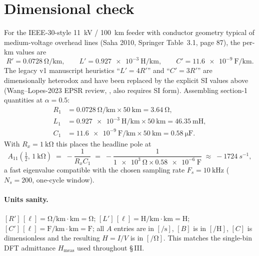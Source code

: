 \documentclass[11pt,a4paper]{article}
\begin{document}
\section{Dimensional check}\label{sec:dim}

For the IEEE-30-style 11~kV / 100~km feeder with conductor geometry
typical of medium-voltage overhead lines (Saha 2010, Springer
Table~3.1, page 87), the per-km values are
\begin{equation}
  R' = \SI{0.0728}{\ohm\per\km},\qquad
  L' = \SI{0.927e-3}{\henry\per\km},\qquad
  C' = \SI{11.6e-9}{\farad\per\km}.
\end{equation}
The legacy v1 manuscript heuristics ``$L' = 4R'$'' and ``$C' = 3R'$''
are dimensionally heterodox and have been replaced by the explicit SI
values above (Wang--Lopes-2023 EPSR review,
, also requires SI form).
Assembling section-1 quantities at $\alpha = 0.5$:
\begin{align}
R_1 &= \SI{0.0728}{\ohm\per\km}\times \SI{50}{\km}
     = \SI{3.64}{\ohm}, \\
L_1 &= \SI{0.927e-3}{\henry\per\km}\times \SI{50}{\km}
     = \SI{46.35}{\milli\henry}, \\
C_1 &= \SI{11.6e-9}{\farad\per\km}\times \SI{50}{\km}
     = \SI{0.58}{\micro\farad}.
\end{align}
With $R_x = \SI{1}{\kilo\ohm}$ this places the headline pole at
\begin{equation}
  A_{11}(\tfrac12,\,\SI{1}{\kilo\ohm}) \;=\; -\frac{1}{R_x C_1}
        \;=\; -\frac{1}{\SI{1e3}{\ohm}\times \SI{0.58e-6}{\farad}}
        \;\approx\; -\SI{1724}{s^{-1}},
\end{equation}
a fast eigenvalue compatible with the chosen sampling rate
$F_s = \SI{10}{\kilo\hertz}$ ($N_s = 200$, one-cycle window).

\paragraph{Units sanity.}
$[R']\,[\ell] = \si{\ohm\per\km}\cdot\si{\km} = \si{\ohm}$;
$[L']\,[\ell] = \si{\henry\per\km}\cdot\si{\km} = \si{\henry}$;
$[C']\,[\ell] = \si{\farad\per\km}\cdot\si{\km} = \si{\farad}$;
all $A$ entries are in $[\si{\per\second}]$, $[B]$ is in
$[\si{\per\henry}]$, $[C]$ is dimensionless and the resulting
$H = I/V$ is in $[\si{\per\ohm}]$.  This matches the
single-bin DFT admittance $H_{\text{meas}}$ used throughout
\S\,III.
\end{document}
